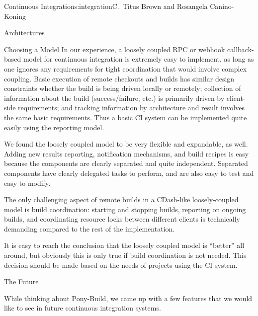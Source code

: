 \begin{aosachapter}{Continuous Integration}{s:integration}{C.\ Titus Brown and Rosangela Canino-Koning}
\begin{aosasect1}{Architectures}
\begin{aosasect2}{Choosing a Model}
In our experience, a loosely coupled RPC or webhook callback-based
model for continuous integration is extremely easy to implement, as
long as one ignores any requirements for tight coordination that would
involve complex coupling. Basic execution of remote checkouts and
builds has similar design constraints whether the build is being
driven locally or remotely; collection of information about the build
(success/failure, etc.) is primarily driven by client-side
requirements; and tracking information by architecture and result
involves the same basic requirements.  Thus a basic CI system can be
implemented quite easily using the reporting model.

We found the loosely coupled model to be very flexible and expandable,
as well. Adding new results reporting, notification mechanisms, and
build recipes is easy because the components are clearly separated and
quite independent. Separated components have clearly delegated tasks
to perform, and are also easy to test and easy to modify.

The only challenging aspect of remote builds in a CDash-like
loosely-coupled model is build coordination: starting and stopping
builds, reporting on ongoing builds, and coordinating resource locks
between different clients is technically demanding compared to the
rest of the implementation.

It is easy to reach the conclusion that the loosely coupled model is
``better'' all around, but obviously this is only true if build
coordination is not needed.  This decision should be made based on the
needs of projects using the CI system.

\end{aosasect2}

\end{aosasect1}

\begin{aosasect1}{The Future}

While thinking about Pony-Build, we came up with a few features that
we would like to see in future continuous integration systems.

\begin{aosadescription}


\end{aosadescription}
\end{aosasect1}
\end{aosachapter}
